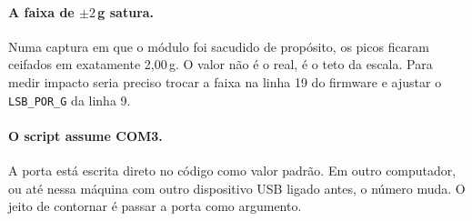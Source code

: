 \documentclass[11pt,a4paper]{article}
\begin{document}
\paragraph{A faixa de $\pm 2$\,g satura.} Numa captura em que o módulo foi
sacudido de propósito, os picos ficaram ceifados em exatamente 2{,}00\,g. O
valor não é o real, é o teto da escala. Para medir impacto seria preciso
trocar a faixa na linha 19 do firmware e ajustar o \texttt{LSB\_POR\_G} da
linha 9.

\paragraph{O script assume COM3.} A porta está escrita direto no código como
valor padrão. Em outro computador, ou até nessa máquina com outro dispositivo
USB ligado antes, o número muda. O jeito de contornar é passar a porta como
argumento.
\end{document}
